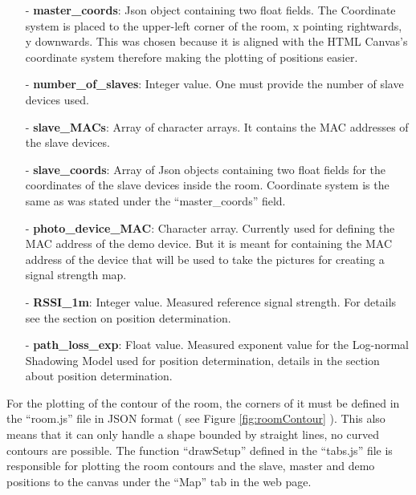 \documentclass[11pt,a4paper]{article}
\begin{document}
\begin{itemize}
\item[-] \textbf{master\_coords}: Json object containing two float fields. The Coordinate system is placed to the upper-left corner of the room, x pointing rightwards, y downwards. This was chosen because it is aligned with the HTML Canvas's coordinate system therefore making the plotting of positions easier.\\

\item[-] \textbf{number\_of\_slaves}: Integer value. One must provide the number of slave devices used.\\

\item[-] \textbf{slave\_MACs}: Array of character arrays. It contains the MAC addresses of the slave devices.\\

\item[-] \textbf{slave\_coords}: Array of Json objects containing two float fields for the coordinates of the slave devices inside the room. Coordinate system is the same as was stated under the ``master\_coords'' field.\\

\item[-] \textbf{photo\_device\_MAC}: Character array. Currently used for defining the MAC address of the demo device. But it is meant for containing the MAC address of the device that will be used to take the pictures for creating a signal strength map.\\

\item[-] \textbf{RSSI\_1m}: Integer value. Measured reference signal strength. For details see the section on position determination.\\

\item[-] \textbf{path\_loss\_exp}: Float value. Measured exponent value for the Log-normal Shadowing Model used for position determination, details in the section about position determination.\\

\end{itemize}

For the plotting of the contour of the room, the corners of it must be defined in the ``room.js'' file in JSON format ( see Figure \ref{fig:roomContour} ). This also means that it can only handle a shape bounded by straight lines, no curved contours are possible. The function ``drawSetup'' defined in the ``tabs.js'' file is responsible for plotting the room contours and the slave, master and demo positions to the canvas under the ``Map'' tab in the web page.
\end{document}
